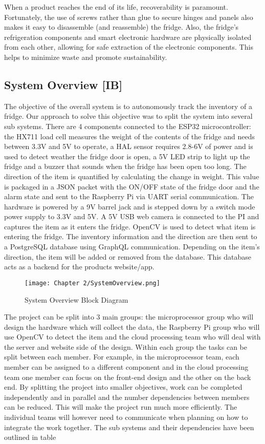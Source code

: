 When a product reaches the end of its life, recoverability is paramount.
Fortunately, the use of screws rather than glue to secure hinges and panels also makes it easy to disassemble (and reassemble) the fridge.
Also, the fridge's refrigeration components and smart electronic hardware are physically isolated from each other, allowing for safe extraction of the electronic components.
This helps to minimize waste and promote sustainability.

\subsection{System Overview [IB]}
The objective of the overall system is to autonomously track the inventory of a fridge.
Our approach to solve this objective was to split the system into several sub systems.
There are 4 components connected to the ESP32 microcontroller: the HX711 load cell measures the weight of the contents of the fridge and needs between 3.3V and 5V to operate, a HAL sensor requires 2.8-6V of power and is used to detect weather the fridge door is open, a 5V LED strip to light up the fridge and a buzzer that sounds when the fridge has been open too long.
The direction of the item is quantified by calculating the change in weight.
This value is packaged in a JSON packet with the ON/OFF state of the fridge door and the alarm state and sent to the Raspberry Pi via UART serial communication.
The hardware is powered by a 9V barrel jack and is stepped down by a switch mode power supply to 3.3V and 5V.
A 5V USB web camera is connected to the PI and captures the item as it enters the fridge.
OpenCV is used to detect what item is entering the fridge.
The inventory information and the direction are then sent to a PostgreSQL database using GraphQL communication.
Depending on the item's direction, the item will be added or removed from the database.
This database acts as a backend for the products website/app.

\begin{figure}[H]        
    \centering
    \texttt{[image: Chapter 2/SystemOverview.png]}
    \caption{System Overview Block Diagram}
    \label{fig:blockdia}
\end{figure} 

The project can be split into 3 main groups: the microprocessor group who will design the hardware which will collect the data, the Raspberry Pi group who will use OpenCV to detect the item and the cloud processing team who will deal with the server and website side of the design.
Within each group the tasks can be split between each member.
For example, in the microprocessor team, each member can be assigned to a different component and in the cloud processing team one member can focus on the front-end design and the other on the back end.
By splitting the project into smaller objectives, work can be completed independently and in parallel and the number dependencies between members can be reduced.
This will make the project run much more efficiently.
The individual teams will however need to communicate when planning on how to integrate the work together.
The sub systems and their dependencies have been outlined in table %

